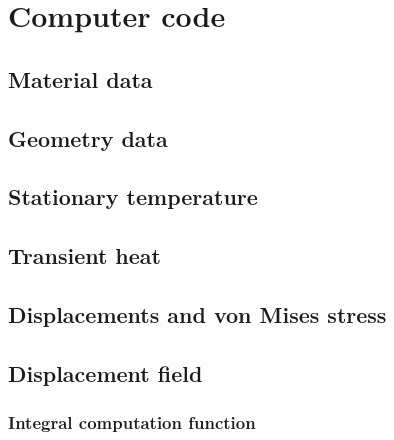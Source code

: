 \documentclass[a4paper,11pt]{article}
\begin{document}
\newpage

\appendix

\section{Computer code}

\subsection{Material data} \label{kod:constants}

\bigskip

\subsection{Geometry data}\label{kod:geometry}

\bigskip

\subsection{Stationary temperature}\label{kod:stationary}

\bigskip

\subsection{Transient heat}\label{kod:transient}
 
\bigskip

\subsection{Displacements and von Mises stress}\label{kod:stress}

\bigskip

\subsection{Displacement field}\label{kod:displacement}

\bigskip

\subsubsection{Integral computation function}

\end{document}
